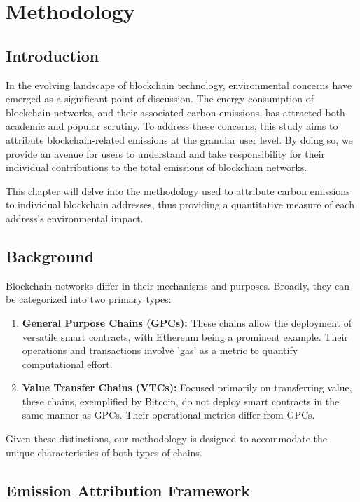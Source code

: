 \documentclass[12pt,a4paper]{report}
\begin{document}
\chapter{Methodology}

\section{Introduction}

In the evolving landscape of blockchain technology, environmental concerns have emerged as a significant point of discussion. The energy consumption of blockchain networks, and their associated carbon emissions, has attracted both academic and popular scrutiny. To address these concerns, this study aims to attribute blockchain-related emissions at the granular user level. By doing so, we provide an avenue for users to understand and take responsibility for their individual contributions to the total emissions of blockchain networks.

This chapter will delve into the methodology used to attribute carbon emissions to individual blockchain addresses, thus providing a quantitative measure of each address's environmental impact.

\section{Background}

Blockchain networks differ in their mechanisms and purposes. Broadly, they can be categorized into two primary types:

\begin{enumerate}
    \item \textbf{General Purpose Chains (GPCs):} These chains allow the deployment of versatile smart contracts, with Ethereum being a prominent example. Their operations and transactions involve 'gas' as a metric to quantify computational effort.
    \item \textbf{Value Transfer Chains (VTCs):} Focused primarily on transferring value, these chains, exemplified by Bitcoin, do not deploy smart contracts in the same manner as GPCs. Their operational metrics differ from GPCs.
\end{enumerate}

Given these distinctions, our methodology is designed to accommodate the unique characteristics of both types of chains.

\section{Emission Attribution Framework}
\end{document}
